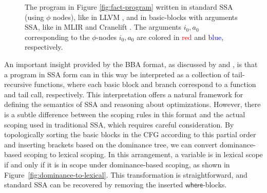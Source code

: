 \documentclass[acmsmall,screen,review]{acmart}
\newcommand{\ms}[1]{\ensuremath{\mathsf{#1}}}
\begin{document}
\begin{figure}
  \caption{
    The program in Figure \ref{fig:fact-program} written in standard SSA (using $\phi$ nodes),
    like in LLVM \cite{llvm}, and in basic-blocks with arguments SSA, like in MLIR \cite{mlir} and
    Cranelift \cite{cranelift}. The arguments $i_0, a_0$ corresponding to the $\phi$-nodes $i_0,
    a_0$ are colored in \textcolor{red}{red} and \textcolor{blue}{blue}, respectively.
  }

  \Description{}
\end{figure}

An important insight provided by the BBA format, as discussed by \citet{appel-ssa} and
\citet{kelsey-95-cps}, is that a program in SSA form can in this way be interpreted as a collection
of tail-recursive functions, where each basic block and branch correspond to a function and tail
call, respectively. This interpretation offers a natural framework for defining the semantics of SSA
and reasoning about optimizations. However, there is a subtle difference between the scoping rules
in this format and the actual scoping used in traditional SSA, which requires careful consideration.
By topologically sorting the basic blocks in the CFG according to this partial order and inserting
brackets based on the dominance tree, we can convert dominance-based scoping to lexical scoping. In
this arrangement, a variable is in lexical scope if and only if it is in scope under dominance-based
scoping, as shown in Figure~\ref{fig:dominance-to-lexical}. This transformation is straightforward,
and standard SSA can be recovered by removing the inserted \ms{where}-blocks.
\end{document}
